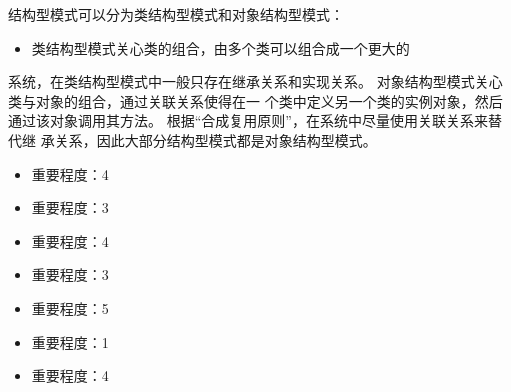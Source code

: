 \documentclass[letterpaper,10pt,english]{sphinxmanual}
\begin{document}
\sphinxAtStartPar
结构型模式可以分为类结构型模式和对象结构型模式：
\begin{itemize}
\item {} 
\sphinxAtStartPar
类结构型模式关心类的组合，由多个类可以组合成一个更大的

\end{itemize}

\sphinxAtStartPar
系统，在类结构型模式中一般只存在继承关系和实现关系。
\sphinxhyphen{} 对象结构型模式关心类与对象的组合，通过关联关系使得在一
个类中定义另一个类的实例对象，然后通过该对象调用其方法。
根据“合成复用原则”，在系统中尽量使用关联关系来替代继
承关系，因此大部分结构型模式都是对象结构型模式。

\sphinxAtStartPar
{}
\begin{itemize}
\item {} \begin{description}
\sphinxAtStartPar
重要程度：4

\end{description}

\item {} \begin{description}
\sphinxAtStartPar
重要程度：3

\end{description}

\item {} \begin{description}
\sphinxAtStartPar
重要程度：4

\end{description}

\item {} \begin{description}
\sphinxAtStartPar
重要程度：3

\end{description}

\item {} \begin{description}
\sphinxAtStartPar
重要程度：5

\end{description}

\item {} \begin{description}
\sphinxAtStartPar
重要程度：1

\end{description}

\item {} \begin{description}
\sphinxAtStartPar
重要程度：4

\end{description}

\end{itemize}
\end{document}
